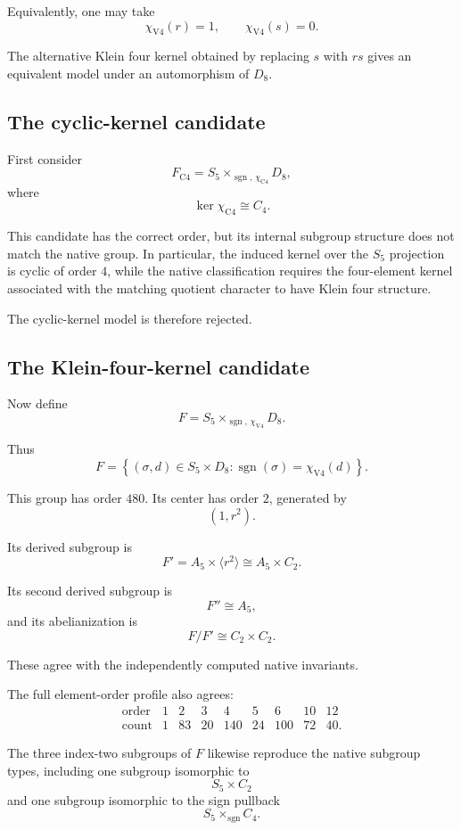 Equivalently, one may take
\[
\chi_{\mathrm{V4}}(r)=1,
\qquad
\chi_{\mathrm{V4}}(s)=0.
\]

The alternative Klein four kernel obtained by replacing $s$ with $rs$
gives an equivalent model under an automorphism of $D_8$.

\subsection{The cyclic-kernel candidate}

First consider
\[
F_{\mathrm{C4}}
=
S_5\times_{\operatorname{sgn},\,\chi_{\mathrm{C4}}}D_8,
\]
where
\[
\ker\chi_{\mathrm{C4}}\cong C_4.
\]

This candidate has the correct order, but its internal subgroup structure
does not match the native group. In particular, the induced kernel over
the $S_5$ projection is cyclic of order $4$, while the native
classification requires the four-element kernel associated with the
matching quotient character to have Klein four structure.

The cyclic-kernel model is therefore rejected.

\subsection{The Klein-four-kernel candidate}

Now define
\[
F
=
S_5\times_{\operatorname{sgn},\,\chi_{\mathrm{V4}}}D_8.
\]

Thus
\[
F
=
\left\{
(\sigma,d)\in S_5\times D_8:
\operatorname{sgn}(\sigma)=\chi_{\mathrm{V4}}(d)
\right\}.
\]

This group has order $480$. Its center has order $2$, generated by
\[
(1,r^2).
\]

Its derived subgroup is
\[
F'
=
A_5\times\langle r^2\rangle
\cong
A_5\times C_2.
\]

Its second derived subgroup is
\[
F''\cong A_5,
\]
and its abelianization is
\[
F/F'
\cong C_2\times C_2.
\]

These agree with the independently computed native invariants.

The full element-order profile also agrees:
\[
\begin{array}{c|rrrrrrrr}
\text{order}
&1&2&3&4&5&6&10&12\\
\hline
\text{count}
&1&83&20&140&24&100&72&40.
\end{array}
\]

The three index-two subgroups of $F$ likewise reproduce the native
subgroup types, including one subgroup isomorphic to
\[
S_5\times C_2
\]
and one subgroup isomorphic to the sign pullback
\[
S_5\times_{\operatorname{sgn}}C_4.
\]

